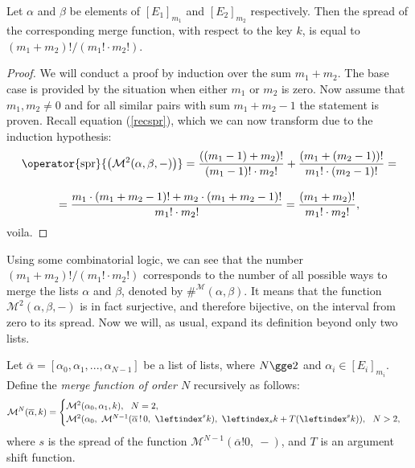 \documentclass[12pt, a4paper]{article}
\newcommand{\M}{\mathcal{M}}
\newcommand{\spr}[1]{\operator{\mathrm{spr}}{\left(#1\right)}}
\newcommand{\lli}[1]{\leftindex_{#1}}
\newcommand{\lui}[1]{\leftindex^{#1}}
\newcommand{\wo}{\mathop{!}}
\begin{document}
\begin{proposition}
    Let $ \alpha $ and $ \beta $ be elements of $ [E_1]_{m_1} $ and $ [E_2]_{m_2} $ respectively. Then the spread of the corresponding merge function, with respect to the key $ k $, is equal to $ (m_1 + m_2)!/(m_1! \cdot m_2!) $.
\end{proposition}
\begin{proof}
    We will conduct a proof by induction over the sum $ m_1 + m_2 $. The base case is provided by the situation when either $ m_1 $ or $ m_2 $ is zero. Now assume that $ m_1, m_2 \ne 0 $ and for all similar pairs with sum $ m_1 + m_2 - 1 $ the statement is proven. Recall equation (\ref{recspr}), which we can now transform due to the induction hypothesis:
    \begin{gather*}
        \spr{\M^2(\alpha, \beta, -)} = \frac{((m_1 - 1) + m_2)!}{(m_1 - 1)! \cdot m_2!} + \frac{(m_1 + (m_2 - 1))!}{m_1! \cdot (m_2 - 1)!} = \\[3mm]
        = \frac{m_1 \cdot (m_1 + m_2 - 1)! + m_2 \cdot (m_1 + m_2 - 1)!}{m_1! \cdot m_2!} = \frac{(m_1 + m_2)!}{m_1! \cdot m_2!},
    \end{gather*}
    voila.
\end{proof}

Using some combinatorial logic, we can see that the number $ (m_1 + m_2)!/(m_1! \cdot m_2!) $ corresponds to the number of all possible ways to merge the lists $ \alpha $ and $ \beta $, denoted by $ \#^{\M}(\alpha, \beta) $. It means that the function $ \M^2(\alpha, \beta, -) $ is in fact surjective, and therefore bijective, on the interval from zero to its spread. Now we will, as usual, expand its definition beyond only two lists.

\begin{definition}
    Let $ \overline{\alpha} = [\alpha_0, \alpha_1, ..., \alpha_{N-1}] $ be a list of lists, where $ N \gge 2 $ and $ \alpha_i \in [E_i]_{m_i} $. Define the \emph{merge function of order $ N $} recursively as follows:
    \[ \M^N(\overline{\alpha}, k) = \begin{cases}
        \M^2(\alpha_0, \alpha_1, k), \ \ N = 2,\\
        \M^2(\alpha_0,\ \M^{N-1}(\overline{\alpha} \wo 0, \ \lui{s}k),\ \lli{s}k + T(\lui{s}k)), \ \ N > 2,
    \end{cases} \]
    where $ s $ is the spread of the function $ \M^{N-1}(\overline{\alpha} \wo 0, \ -) $, and $ T $ is an argument shift function.
\end{definition}
\end{document}
